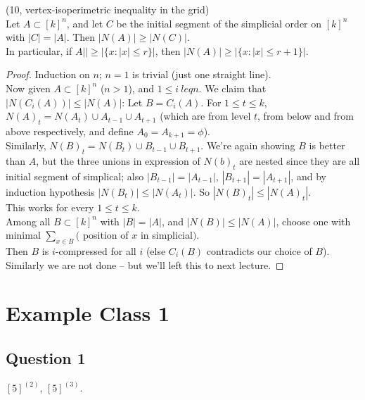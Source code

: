 \documentclass[a4paper]{article}
\begin{document}
\begin{thm} (10, vertex-isoperimetric inequality in the grid)\\
    Let $A \subset [k]^n$, and let $C$ be the initial segment of the simplicial order on $[k]^n$ with $|C|=|A|$. Then $|N(A)| \geq |N(C)|$.\\
    In particular, if $A|| \geq |\{x:|x| \leq r\}|$, then $|N(A)| \geq |\{x:|x| \leq r+1\}|$.
    \begin{proof}
        Induction on $n$; $n=1$ is trivial (just one straight line).\\
        Now given $A \subset [k]^n$ ($n>1$), and $1 \leq i\ leq n$. We claim that $|N(C_i(A))| \leq |N(A)|$: Let $B = C_i(A)$. For $1 \leq t \leq k$, $N(A)_t = N(A_t) \cup A_{t-1} \cup A_{t+1}$ (which are from level $t$, from below and from above respectively, and define $A_0 = A_{k+1} = \phi$).\\
        Similarly, $N(B)_t = N(B_t) \cup B_{t-1} \cup B_{t+1}$. We're again showing $B$ is better than $A$, but the three unions in expression of $N(b)_t$ are nested since they are all initial segment of simplical; also $|B_{t-1}| = |A_{t-1}|$, $|B_{t+1}| = |A_{t+1}|$, and by induction hypothesis $|N(B_t)| \leq |N(A_t)|$. So $|N(B)_t| \leq |N(A)_t|$.\\
        This works for every $1 \leq t \leq k$.\\
        Among all $B \subset [k]^n$ with $|B| = |A|$, and $|N(B)| \leq |N(A)|$, choose one with minimal $\sum_{x \in B} ($ position of $x$ in simplicial$)$.\\
        Then $B$ is $i$-compressed for all $i$ (else $C_i(B)$ contradicts our choice of $B$).\\
        Similarly we are not done -- but we'll left this to next lecture.
    \end{proof}
\end{thm}








\newpage

\section{Example Class 1}

\subsection{Question 1}
$[5]^{(2)}$, $[5]^{(3)}$.
\end{document}
